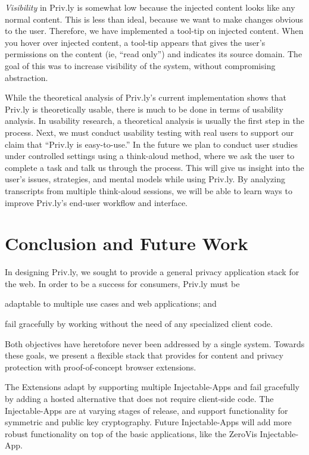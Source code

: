 \documentclass[letterpaper,twocolumn,10pt]{article}
\begin{document}
\emph{Visibility} in Priv.ly is somewhat low because the injected content looks like any 
normal content. This is less than ideal, because we want to make changes obvious 
to the user. Therefore, we have implemented a tool-tip on injected content. When 
you hover over injected content, a tool-tip appears that gives the user's 
permissions on the content (ie, ``read only'') and indicates its source domain. 
The goal of this was to increase visibility of the system, without compromising 
abstraction. 

While the theoretical analysis of Priv.ly's current implementation shows that 
Priv.ly is theoretically usable, there is much to be done in terms of usability 
analysis. In usability research, a theoretical analysis is usually the first step 
in the process. Next, we must conduct usability testing with real users to support 
our claim that ``Priv.ly is easy-to-use.'' In the future we plan to conduct user 
studies under controlled settings using a think-aloud method, where we ask the 
user to complete a task and talk us through the process. This will give us insight 
into the user's issues, strategies, and mental models while using Priv.ly. By 
analyzing transcripts from multiple think-aloud sessions, we will be able to learn 
ways to improve Priv.ly's end-user workflow and interface.




\section{Conclusion and Future Work} \label{sec:conclusion}

In designing Priv.ly, we sought to provide a general privacy application stack for 
the web. In order to be a success for consumers, Priv.ly must be 
\begin{inparaenum}
\item adaptable to multiple use cases and web applications; and
\item fail gracefully by working without the need of any specialized client code.
\end{inparaenum} Both objectives have heretofore never been addressed by a single system.
Towards these goals, we present a flexible stack that provides 
for content and privacy protection with proof-of-concept browser extensions. 

The Extensions adapt by supporting multiple Injectable-Apps and 
fail gracefully by adding a hosted alternative that does not require client-side 
code. The Injectable-Apps are at varying stages of release, and support functionality
for symmetric and public key cryptography. Future Injectable-Apps will add more
robust functionality on top of the basic applications, like the ZeroVis Injectable-App.
\end{document}
